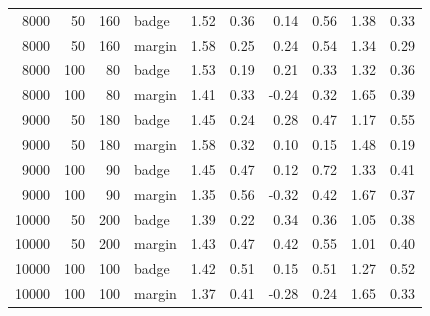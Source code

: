 \begin{tabular}{rrrlrrrrrr}
8000 & 50 & 160 & badge & 1.52 & 0.36 & 0.14 & 0.56 & 1.38 & 0.33 \\
8000 & 50 & 160 & margin & 1.58 & 0.25 & 0.24 & 0.54 & 1.34 & 0.29 \\
8000 & 100 & 80 & badge & 1.53 & 0.19 & 0.21 & 0.33 & 1.32 & 0.36 \\
8000 & 100 & 80 & margin & 1.41 & 0.33 & -0.24 & 0.32 & 1.65 & 0.39 \\
9000 & 50 & 180 & badge & 1.45 & 0.24 & 0.28 & 0.47 & 1.17 & 0.55 \\
9000 & 50 & 180 & margin & 1.58 & 0.32 & 0.10 & 0.15 & 1.48 & 0.19 \\
9000 & 100 & 90 & badge & 1.45 & 0.47 & 0.12 & 0.72 & 1.33 & 0.41 \\
9000 & 100 & 90 & margin & 1.35 & 0.56 & -0.32 & 0.42 & 1.67 & 0.37 \\
10000 & 50 & 200 & badge & 1.39 & 0.22 & 0.34 & 0.36 & 1.05 & 0.38 \\
10000 & 50 & 200 & margin & 1.43 & 0.47 & 0.42 & 0.55 & 1.01 & 0.40 \\
10000 & 100 & 100 & badge & 1.42 & 0.51 & 0.15 & 0.51 & 1.27 & 0.52 \\
10000 & 100 & 100 & margin & 1.37 & 0.41 & -0.28 & 0.24 & 1.65 & 0.33 \\
\bottomrule
\end{tabular}
